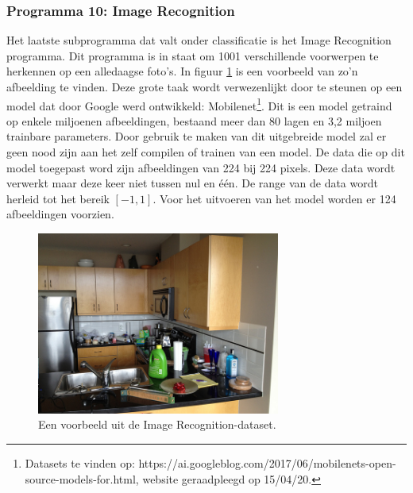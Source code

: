 		\subsubsection{Programma 10: Image Recognition}
		Het laatste subprogramma dat valt onder classificatie is het Image Recognition programma. Dit programma is in staat om 1001 verschillende voorwerpen te herkennen op een alledaagse foto's. In figuur \ref{fig:ImRec1} is een voorbeeld van zo'n afbeelding te vinden. Deze grote taak wordt verwezenlijkt door te steunen op een model dat door Google werd ontwikkeld: Mobilenet\footnote{Datasets te vinden op: https://ai.googleblog.com/2017/06/mobilenets-open-source-models-for.html, website geraadpleegd op 15/04/20.}. Dit is een model getraind op enkele miljoenen afbeeldingen, bestaand meer dan 80 lagen en 3,2 miljoen trainbare parameters. 
		Door gebruik te maken van dit uitgebreide model zal er geen nood zijn aan het zelf compilen of trainen van een model. De data die op dit model toegepast word zijn afbeeldingen van 224 bij 224 pixels. Deze data wordt verwerkt maar deze keer niet tussen nul en \'e\'en. De range van de data wordt herleid tot het bereik $[-1, 1]$. Voor het uitvoeren van het model worden er 124 afbeeldingen voorzien. 
		
		\begin{figure}
			\centering
			\includegraphics[width=80mm]{afbeeldingen/ImRec1.jpg}
			\caption{Een voorbeeld uit de Image Recognition-dataset.}
			\label{fig:ImRec1}
		\end{figure}

